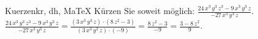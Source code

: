 \begin{MAufgabe}{Kuerzen}{kr, dh, MaTeX}
K\"urzen Sie soweit m\"oglich: $\frac{24\, x^3\, y^3\, z^3 - 9\, x^3\, y^3\, z}{- 27\, x^3\, y^3\, z}$.\\ 
\ifLsg\MLoesung
\quad $\frac{24\, x^3\, y^3\, z^3 - 9\, x^3\, y^3\, z}{- 27\, x^3\, y^3\, z}=\frac{(3\, x^3\, y^3\, z)\cdot(8\, z^2 - 3)}{(3\, x^3\, y^3\, z)\cdot(-9)}=\frac{8\, z^2 - 3}{-9}=\frac{3 - 8\, z^2}{9}$.\else\relax\fi
 \end{MAufgabe}